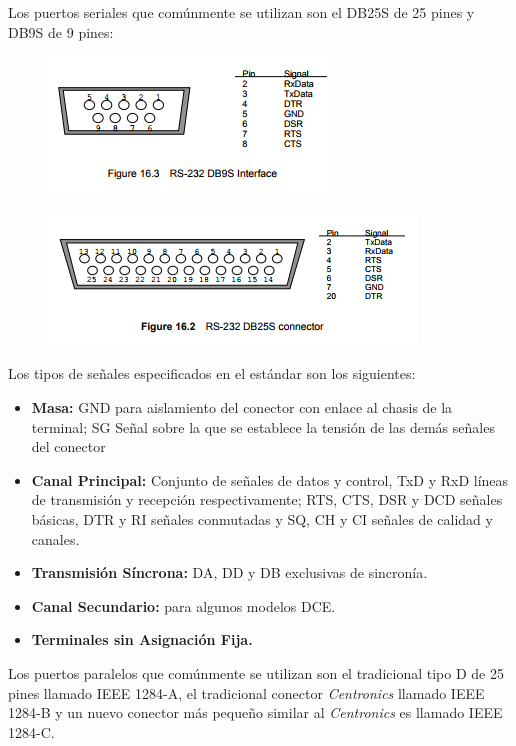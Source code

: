 \documentclass[a4paper,12pt]{article}
\begin{document}
\begin{enumerate}
  Los puertos seriales que comúnmente se utilizan son el DB25S  de 25 pines y DB9S de 9 pines:
  \begin{figure}[H]
   \centering
   \includegraphics[scale = 0.4]{2.png}
  \end{figure}
  \begin{figure}[H]
   \centering
   \includegraphics[scale = 0.4]{3.png}
  \end{figure}
  Los tipos de señales especificados en el estándar son los siguientes:
  \begin{itemize}
   \item \textbf{Masa:} GND para aislamiento del conector con enlace al chasis de la terminal; SG Señal sobre la que se establece la tensión de las demás señales del conector
   \item \textbf{Canal Principal:} Conjunto de señales de datos y control, TxD y RxD líneas de transmisión y recepción 
   respectivamente; RTS, CTS, DSR y DCD señales básicas, DTR y RI señales conmutadas y SQ, CH y CI señales de calidad y canales.
   \item \textbf{Transmisión Síncrona:}  DA, DD y DB exclusivas de sincronía.
   \item \textbf{Canal Secundario:} para algunos modelos DCE.
   \item \textbf{Terminales sin Asignación Fija.}
  \end{itemize}
  Los puertos paralelos que comúnmente se utilizan son el tradicional tipo D de 25 pines llamado IEEE 1284-A, el tradicional
  conector \textit{Centronics} llamado IEEE 1284-B y un nuevo conector más pequeño similar al \textit{Centronics} es llamado IEEE
  1284-C.
  \begin{figure}[H]
   \centering

\end{figure}
\end{enumerate}
\end{document}
